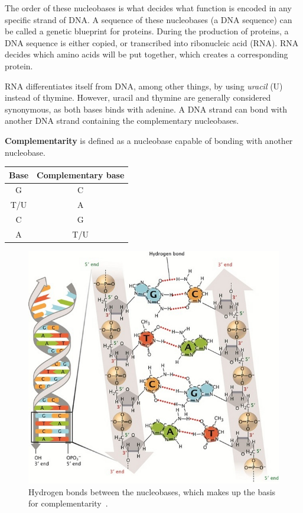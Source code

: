 \documentclass[12pt]{article}
\theoremstyle{definition}
\begin{document}
The order of these nucleobases is what decides what function is encoded in any specific strand of DNA. A sequence of these nucleobases (a DNA sequence) can be called a genetic blueprint for proteins. During the production of proteins, a DNA sequence is either copied, or transcribed into ribonucleic acid (RNA). RNA decides which amino acids will be put together, which creates a corresponding protein.

RNA differentiates itself from DNA, among other things, by using \emph{uracil} (U) instead of thymine. However, uracil and thymine are generally considered synonymous, as both bases binds with adenine. A DNA strand can bond with another DNA strand containing the complementary nucleobases.

\begin{definition}
\textbf{Complementarity} is defined as a nucleobase capable of bonding with another nucleobase.
\begin{center}
\begin{tabular}{|c|c|}
\hline
Base & Complementary base \\
\hline
G & C \\
T/U & A \\
C & G \\
A & T/U \\
\hline
\end{tabular}
\end{center}
\end{definition}

\begin{figure}[H]
	\label{Complementarity}
	\begin{center}
		\includegraphics[scale=2.5]{complementarity.jpg}	
	\end{center}
	\caption{Hydrogen bonds between the nucleobases, which makes up the basis for complementarity~\cite{DNA-nature}.}
\end{figure}
\end{document}
